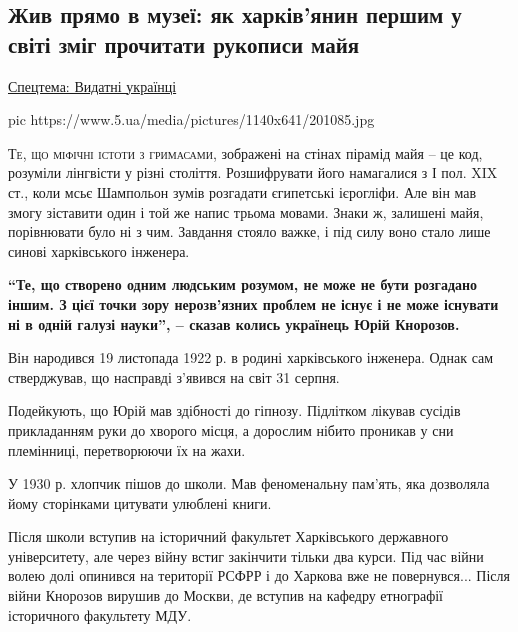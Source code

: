  
 
 

\subsection{Жив прямо в музеї: як харків'янин першим у світі зміг прочитати рукописи майя}
\href{https://www.5.ua/spetstemy/154}{Спецтема: Видатні українці}


\ifcmt
pic https://www.5.ua/media/pictures/1140x641/201085.jpg
\fi

\lettrine[lines=3]{Т}{е, що міфічні істоти з гримасами}, зображені на стінах пірамід майя – це
код, розуміли лінгвісти у різні століття. Розшифрувати його намагалися з І
пол. XIX ст., коли мсьє Шампольон зумів розгадати єгипетські ієрогліфи.
Але він мав змогу зіставити один і той же напис трьома мовами. Знаки ж,
залишені майя, порівнювати було ні з чим. Завдання стояло важке, і під
силу воно стало лише синові харківського інженера.

\begin{leftbar}
  \bfseries
  \enquote{Те, що створено одним людським розумом, не може не бути розгадано
  іншим. З цієї точки зору нерозв'язних проблем не існує і не може
  існувати ні в одній галузі науки}, – сказав колись українець Юрій
  Кнорозов.
\end{leftbar}

Він народився 19 листопада 1922 р. в родині харківського інженера. Однак
сам стверджував, що насправді з'явився на світ 31 серпня.

Подейкують, що Юрій мав здібності до гіпнозу. Підлітком лікував сусідів
прикладанням руки до хворого місця, а дорослим нібито проникав у сни
племінниці, перетворюючи їх на жахи.

У 1930 р. хлопчик пішов до школи. Мав феноменальну пам'ять, яка дозволяла
йому сторінками цитувати улюблені книги.

Після школи вступив на історичний факультет Харківського державного
університету, але через війну встиг закінчити тільки два курси. Під час
війни волею долі опинився на території РСФРР і до Харкова вже не
повернувся... Після війни Кнорозов вирушив до Москви, де вступив на
кафедру етнографії історичного факультету МДУ.

